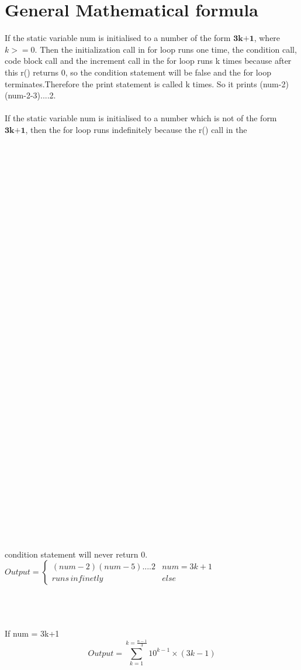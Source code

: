 \documentclass[journal,12pt,twocolumn]{IEEEtran}
\begin{document}
\section{General Mathematical formula}
If the static variable num is initialised to a number of the form $\textbf{3k+1}$, where $k>=0$. Then the initialization call in for loop runs one time, the condition call, code block call and the increment call in the for loop runs k times because after this r() returns 0, so the condition statement will be false and the for loop terminates.Therefore the print statement is called k times. So it prints (num-2)(num-2-3)....2.
\\
\\
If the static variable num is initialised to a number which is not of the form $\textbf{3k+1}$, then the for loop runs indefinitely because the r() call in the
\\
\\
\\
\\
\\
\\
\\
\\
\\
\\
\\
\\
\\
\\
\\
\\
\\
\\
\\
\\
\\
\\
\\
\\
\\
\\
\\
\\
\\
\\
\\
\\
\\
\\
\\
\\
\\
condition statement will never return 0.
$
Output = \begin{cases} 
      (num-2)(num-5)....2 & num=3k+1 \\
      runs\,infinetly & else
   \end{cases}
$

\\
\\
\\
If num = 3k+1
\[
Output = \sum_{k=1}^{k=\frac{n-1}{3}} 10^{k-1}\times (3k-1)
\]
\end{document}
